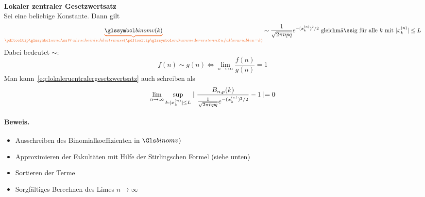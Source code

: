 \begin{satz}
    \textbf{Lokaler zentraler Gesetzwertsatz}  \\
    Sei  eine beliebige Konstante.
    Dann gilt
    \begin{equation}
        \label{eq:lokaleruentralergesetzwertsatz}
        \oub{\Binomv(k)}{\pe(\sn = k)} \sim \frac{1}{\sqrt{2 \pi npq}} e^{-(x_k^{(n)})^2 / 2} \text{ gleichmäßig für alle $k$ mit }  |x_k^{(n)}| \leq L
    \end{equation}
    Dabei bedeutet $\sim$:
    \[
        f(n) \sim g(n) \Leftrightarrow \lim_{n \rightarrow \infty} \frac{f(n)}{g(n)}  = 1
    \]
    Man kann~\ref{eq:lokaleruentralergesetzwertsatz} auch schreiben als
    \[
        \lim_{n \rightarrow \infty} \sup_{k: |x_k^{(n)}| \leq L} \mid \frac{{B}_{n,p}(k)}{\frac{1}{\sqrt{2 \pi npq}} e^{-(x_k^{(n)})^2 / 2}}  - 1 \mid = 0
    \]

    \paragraph{Beweis.}
    \begin{itemize}
        \item Ausschreiben des Binomialkoeffizienten in $\binomv)$
        \item Approximieren der Fakultäten mit Hilfe der Stirlingschen Formel (siehe unten)
        \item Sortieren der Terme
        \item Sorgfältiges Berechnen des Limes $n \to \infty$
    \end{itemize}
\end{satz}

